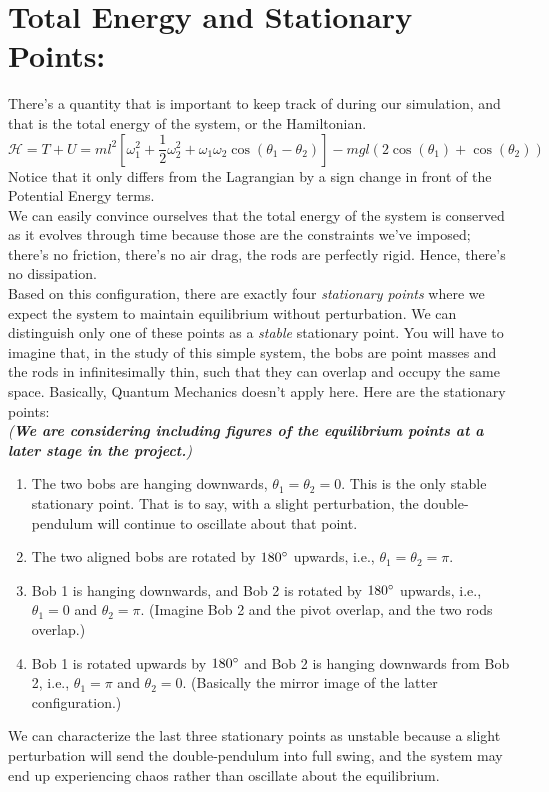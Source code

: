 \documentclass{article}
\begin{document}
\section{Total Energy and Stationary Points:}
There's a quantity that is important to keep track of during our simulation, and that is the total energy of the system, or the Hamiltonian.
\begin{equation}
    \mathcal{H} = T + U = ml^2[\omega_1^2 + \frac{1}{2}\omega_2^2 + \omega_1\omega_2\cos(\theta_1-\theta_2)] - mgl(2\cos(\theta_1) + \cos(\theta_2))
\end{equation}
Notice that it only differs from the Lagrangian by a sign change in front of the Potential Energy terms. 
\\We can easily convince ourselves that the total energy of the system is conserved as it evolves through time because those are the constraints we've imposed; there's no friction, there's no air drag, the rods are perfectly rigid. Hence, there's no dissipation.
\\Based on this configuration, there are exactly four \textit{stationary points} where we expect the system to maintain equilibrium without perturbation. We can distinguish only one of these points as a \textit{stable} stationary point. You will have to imagine that, in the study of this simple system, the bobs are point masses and the rods in infinitesimally thin, such that they can overlap and occupy the same space. Basically, Quantum Mechanics doesn't apply here. Here are the stationary points:
\\\textit{(\textbf{We are considering including figures of the equilibrium points at a later stage in the project.})}
\begin{enumerate}
    \item The two bobs are hanging downwards, $\theta_1 = \theta_2 = 0$. This is the only stable stationary point. That is to say, with a slight perturbation, the double-pendulum will continue to oscillate about that point.
    \item The two aligned bobs are rotated by $180\degree$ upwards, i.e., $\theta_1 = \theta_2 = \pi$.
    \item Bob 1 is hanging downwards, and Bob 2 is rotated by $180\degree$ upwards, i.e., $\theta_1 = 0$ and $\theta_2 = \pi$. (Imagine Bob 2 and the pivot overlap, and the two rods overlap.)
    \item Bob 1 is rotated upwards by $180\degree$ and Bob 2 is hanging downwards from Bob 2, i.e., $\theta_1 = \pi$ and $\theta_2 = 0$. (Basically the mirror image of the latter configuration.)
\end{enumerate}
We can characterize the last three stationary points as unstable because a slight perturbation will send the double-pendulum into full swing, and the system may end up experiencing chaos rather than oscillate about the equilibrium.
\end{document}
